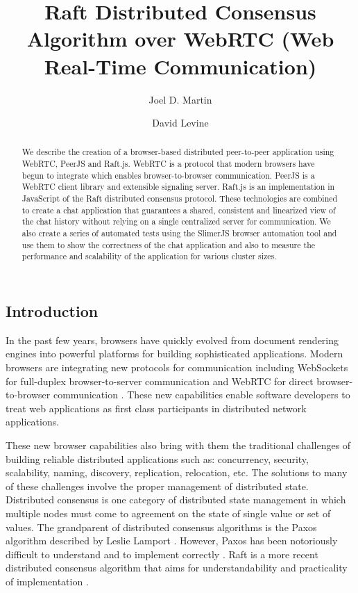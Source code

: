 \documentclass[9pt]{extarticle}
\title{Raft Distributed Consensus Algorithm over WebRTC (Web Real-Time Communication)}
\author{Joel D. Martin}
\author{David Levine}
\affil{University of Texas at Arlington}
\begin{document}
\maketitle

\begin{multicols}{2}

\begin{abstract}
We describe the creation of a browser-based distributed peer-to-peer
application using WebRTC, PeerJS and Raft.js. WebRTC is a protocol
that modern browsers have begun to integrate which enables
browser-to-browser communication. PeerJS is a WebRTC client library
and extensible signaling server. Raft.js is an implementation in
JavaScript of the Raft distributed consensus protocol. These
technologies are combined to create a chat application that guarantees
a shared, consistent and linearized view of the chat history without
relying on a single centralized server for communication. We also
create a series of automated tests using the SlimerJS browser
automation tool and use them to show the correctness of the chat
application and also to measure the performance and scalability of the
application for various cluster sizes.
\end{abstract}

\section{Introduction}
In the past few years, browsers have quickly evolved from document
rendering engines into powerful platforms for building sophisticated
applications. Modern browsers are integrating new protocols for
communication including WebSockets for full-duplex browser-to-server
communication \cite{websockets:rfc6455} and WebRTC for direct
browser-to-browser communication \cite{webrtc:feb2015}. These new
capabilities enable software developers to treat web applications as
first class participants in distributed network applications.

These new browser capabilities also bring with them the traditional
challenges of building reliable distributed applications such as:
concurrency, security, scalability, naming, discovery, replication,
relocation, etc. The solutions to many of these challenges involve
the proper management of distributed state. Distributed consensus is
one category of distributed state management in which multiple nodes
must come to agreement on the state of single value or set of values. %
The grandparent of distributed consensus algorithms is the Paxos
algorithm described by Leslie Lamport \cite{paxos:lamport98}. However,
Paxos has been notoriously difficult to understand and to implement
correctly \cite{paxos:chandra07}. Raft is a more recent distributed
consensus algorithm that aims for understandability and practicality
of implementation \cite{raft_thesis:ongaro14}.


\end{multicols}
\end{document}
